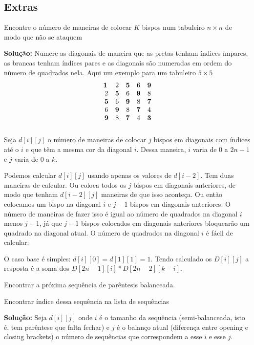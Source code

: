 \subsection{Extras}

 Encontre o número de maneiras de colocar $K$ bispos num tabuleiro $n \times n$ de modo que não se ataquem

\textbf{Solução:} Numere as diagonais de maneira que as pretas tenham índices ímpares, as brancas tenham índices pares e as diagonais são numeradas em ordem do número de quadrados nela. Aqui um exemplo para um tabuleiro $5 \times 5$
$$\begin{matrix}
\bf{1} & 2 & \bf{5} & 6 & \bf{9} \\\
2 & \bf{5} & 6 & \bf{9} & 8 \\\
\bf{5} & 6 & \bf{9} & 8 & \bf{7} \\\
6 & \bf{9} & 8 & \bf{7} & 4 \\\
\bf{9} & 8 & \bf{7} & 4 & \bf{3} \\\
\end{matrix}$$
Seja $d[i][j]$ o número de maneiras de colocar $j$ bispos em diagonais com índices até o $i$ e que têm a mesma cor da diagonal $i$. Dessa maneira, $i$ varia de $0$ a $2n-1$ e $j$ varia de $0$ a $k$.

Podemos calcular $d[i][j]$ usando apenas os valores de $d[i-2]$. Tem duas maneiras de calcular. Ou coloca todos os $j$ bispos em diagonais anteriores, de modo que tenham $d[i-2][j]$ maneiras de que isso aconteça. Ou então colocamos um bispo na diagonal $i$ e $j-1$ bispos em diagonais anteriores. O número de maneiras de fazer isso é igual ao número de quadrados na diagonal $i$ menos $j-1$, já que $j-1$ bispos colocados em diagonais anteriores bloquearão um quadrado na diagonal atual. O número de quadrados na diagonal $i$ é fácil de calcular:


O caso base é simples: $d[i][0] = d[1][1] = 1$. Tendo calculado os $D[i][j]$ a resposta é a soma dos $D[2n-1][i] * D[2n-2][k-i]$.


 Encontrar a próxima sequência de parêntesis balanceada.


 Encontrar índice dessa sequência na lista de sequências

\textbf{Solução:} Seja $d[i][j]$ onde $i$ é o tamanho da sequência (semi-balanceada, isto é, tem parêntese que falta fechar) e $j$ é o balanço atual (diferença entre opening e closing brackets) o número de sequências que correspondem a esse $i$ e esse $j$. 

